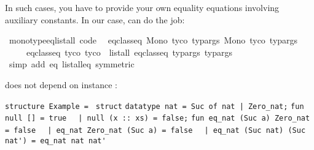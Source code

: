 \begin{isabellebody}
\begin{isamarkuptext}
  In such cases, you have to provide your own equality equations
  involving auxiliary constants.  In our case,
   can do the job:%
\end{isamarkuptext}%
\isamarkuptrue%
%
\isadelimquote
%
\endisadelimquote
%
\isatagquote
{}\isamarkupfalse%
\ monotype{\isacharunderscore}eq{\isacharunderscore}list{\isacharunderscore}all{}\ {\isacharbrackleft}code{\isacharbrackright}{\isacharcolon}\isanewline
\ \ {\isachardoublequoteopen}eq{\isacharunderscore}class{\isachardot}eq\ {\isacharparenleft}Mono\ tyco{}\ typargs{}{\isacharparenright}\ {\isacharparenleft}Mono\ tyco{}\ typargs{}{\isacharparenright}\ {\isasymlongleftrightarrow}\isanewline
\ \ \ \ \ eq{\isacharunderscore}class{\isachardot}eq\ tyco{}\ tyco{}\ {\isasymand}\ list{\isacharunderscore}all{}\ eq{\isacharunderscore}class{\isachardot}eq\ typargs{}\ typargs{}{\isachardoublequoteclose}\isanewline
\ \ \isamarkupfalse%
\ {\isacharparenleft}simp\ add{\isacharcolon}\ eq\ list{\isacharunderscore}all{}{\isacharunderscore}eq\ {\isacharbrackleft}symmetric{\isacharbrackright}{\isacharparenright}%
\endisatagquote
{\isafoldquote}%
%
\isadelimquote
%
\endisadelimquote
%
\begin{isamarkuptext}%
\noindent does not depend on instance :%
\end{isamarkuptext}%
\isamarkuptrue%
%
\isadelimquote
%
\endisadelimquote
%
\isatagquote
%
\begin{isamarkuptext}%
\isaverbatim%
\noindent%
\verb|structure Example = |\newline%
\verb|struct|\newline%
\newline%
\verb|datatype nat = Suc of nat |\verb,|,\verb| Zero_nat;|\newline%
\newline%
\verb|fun null [] = true|\newline%
\verb|  |\verb,|,\verb| null (x :: xs) = false;|\newline%
\newline%
\verb|fun eq_nat (Suc a) Zero_nat = false|\newline%
\verb|  |\verb,|,\verb| eq_nat Zero_nat (Suc a) = false|\newline%
\verb|  |\verb,|,\verb| eq_nat (Suc nat) (Suc nat') = eq_nat nat nat'|\newline%

\end{isamarkuptext}
\end{isabellebody}

